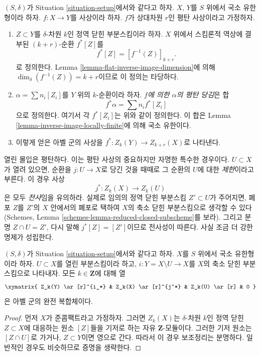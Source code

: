 \begin{definition}
\label{definition-flat-pullback}
$(S, \delta)$가 Situation \ref{situation-setup}에서와 같다고 하자.
$X$, $Y$를 $S$ 위에서 국소 유한형이라 하자.
$f : X \to Y$를 사상이라 하자.
$f$가 상대차원 $r$인 평탄 사상이라고 가정하자.
\begin{enumerate}
\item $Z \subset Y$를 $\delta$-차원 $k$인 정역 닫힌 부분스킴이라 하자.
$X$ 위에서 스킴론적 역상에 결부된 $(k+r)$-순환 $f^*[Z]$를
$$
f^*[Z] = [f^{-1}(Z)]_{k+r}.
$$
로 정의한다. Lemma \ref{lemma-flat-inverse-image-dimension}에 의해
$\dim_\delta(f^{-1}(Z)) = k + r$이므로 이 정의는 타당하다.
\item $\alpha = \sum n_i [Z_i]$를 $Y$ 위의 $k$-순환이라 하자.
{\it $f$에 의한 $\alpha$의 평탄 당김}은 합
$$
f^* \alpha = \sum n_i f^*[Z_i]
$$
으로 정의한다. 여기서 각 $f^*[Z_i]$는 위와 같이 정의한다. 이 합은
Lemma \ref{lemma-inverse-image-locally-finite}에 의해 국소 유한이다.
\item 이렇게 얻은 아벨 군의 사상을
$f^* : Z_k(Y) \to Z_{k + r}(X)$로 나타낸다.
\end{enumerate}
\end{definition}

\noindent
열린 몰입은 평탄하다. 이는 평탄 사상의 중요하지만 자명한 특수한
경우이다. $U \subset X$가 열려 있으면, 순환을 $j : U \to X$로 당긴 것을
때때로 그 순환의 $U$에 대한 {\it 제한}이라고 부른다. 이 경우 사상
$$
j^* : Z_k(X) \longrightarrow Z_k(U)
$$
은 모두 {\it 전사}임을 유의하라. 실제로 임의의 정역 닫힌 부분스킴
$Z' \subset U$가 주어지면, 폐포 $Z$를 $Z'$의 $X$ 안에서의 폐포로 택하여
$X$의 축소 닫힌 부분스킴으로 생각할 수 있다(Schemes, Lemma
\ref{schemes-lemma-reduced-closed-subscheme}를 보라). 그리고 분명
$Z \cap U = Z'$, 다시 말해 $j^*[Z] = [Z']$이므로 전사성이 따른다.
사실 조금 더 강한 명제가 성립한다.

\begin{lemma}
\label{lemma-exact-sequence-open}
$(S, \delta)$가 Situation \ref{situation-setup}에서와 같다고 하자.
$X$를 $S$ 위에서 국소 유한형이라 하자.
$U \subset X$를 열린 부분스킴이라 하고,
$i : Y = X \setminus U \to X$를 $X$의 축소 닫힌 부분스킴으로 나타내자.
모든 $k \in \mathbf{Z}$에 대해 열
$$
\xymatrix{
Z_k(Y) \ar[r]^{i_*} & Z_k(X) \ar[r]^{j^*} & Z_k(U) \ar[r] & 0
}
$$
은 아벨 군의 완전 복합체이다.
\end{lemma}

\begin{proof}
먼저 $X$가 준콤팩트라고 가정하자. 그러면 $Z_k(X)$는
$\delta$-차원 $k$인 정역 닫힌 $Z \subset X$에 대응하는 원소 $[Z]$들을
기저로 하는 자유 $\mathbf{Z}$-모듈이다. 그러한 기저 원소는
$[Z \cap U]$로 가거나, $Z \subset Y$이면 영으로 간다. 따라서 이
경우 보조정리는 분명하다. 일반적인 경우도 비슷하므로 증명을 생략한다.
\end{proof}

